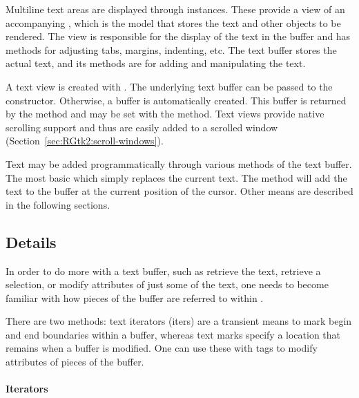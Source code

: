 Multiline text areas are displayed through 
instances. These provide a view of an accompanying
, which is the model that stores the text and
other objects to be rendered. The view is responsible for the display
of the text in the buffer and has methods for adjusting tabs, margins,
indenting, etc. The text buffer stores the actual text, and its
methods are for adding and manipulating the text.

A text view is created with . 
The underlying
text buffer can be passed to the constructor. Otherwise, a buffer is
automatically created.  This buffer is returned by the method
 and may be set with the
 method. Text views provide native
scrolling support and thus are easily added to a scrolled window
(Section~\ref{sec:RGtk2:scroll-windows}).


Text may be added programmatically through various methods of the text
buffer. The most basic  which
simply replaces the current text. The method
 will add the text to the buffer
at the current position of the cursor. 
Other means are described in the following sections.

\subsection{ Details}
\label{sec:RGtk2:text-buffers}

In order to do more with a text buffer, such as retrieve the text, 
retrieve a selection, or modify attributes of just some of the text,
one needs to become familiar with how pieces of the buffer are
referred to within \GTK.

There are two methods: text iterators (iters) are a transient means to
mark begin and end boundaries within a buffer, whereas text marks
specify a location that remains when a buffer is modified. One can use
these with tags to modify attributes of pieces of the buffer.


\paragraph{Iterators}


